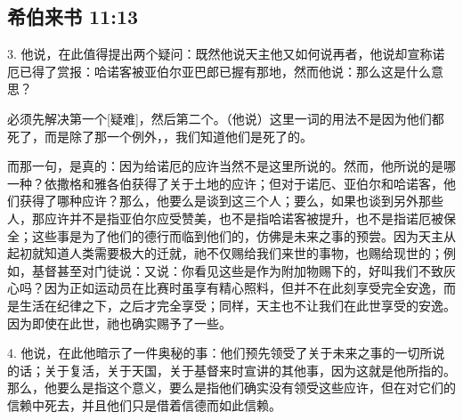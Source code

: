 
\subsection{希伯来书 11:13}

3. 他说，在此值得提出两个疑问：既然他说天主他又如何说再者，他说却宣称诺厄已得了赏报：哈诺客被亚伯尔亚巴郎已握有那地，然而他说：那么这是什么意思？\par

必须先解决第一个[疑难]，然后第二个。（他说）这里一词的用法不是因为他们都死了，而是除了那一个例外，，我们知道他们是死了的。\par

而那一句，是真的：因为给诺厄的应许当然不是这里所说的。然而，他所说的是哪一种？依撒格和雅各伯获得了关于土地的应许；但对于诺厄、亚伯尔和哈诺客，他们获得了哪种应许？那么，他要么是谈到这三个人；要么，如果也谈到另外那些人，那应许并不是指亚伯尔应受赞美，也不是指哈诺客被提升，也不是指诺厄被保全；这些事是为了他们的德行而临到他们的，仿佛是未来之事的预尝。因为天主从起初就知道人类需要极大的迁就，祂不仅赐给我们来世的事物，也赐给现世的；例如，基督甚至对门徒说：又说：你看见这些是作为附加物赐下的，好叫我们不致灰心吗？因为正如运动员在比赛时虽享有精心照料，但并不在此刻享受完全安逸，而是生活在纪律之下，之后才完全享受；同样，天主也不让我们在此世享受的安逸。因为即使在此世，祂也确实赐予了一些。\par

4. 他说，在此他暗示了一件奥秘的事：他们预先领受了关于未来之事的一切所说的话；关于复活，关于天国，关于基督来时宣讲的其他事，因为这就是他所指的。那么，他要么是指这个意义，要么是指他们确实没有领受这些应许，但在对它们的信赖中死去，并且他们只是借着信德而如此信赖。\par


